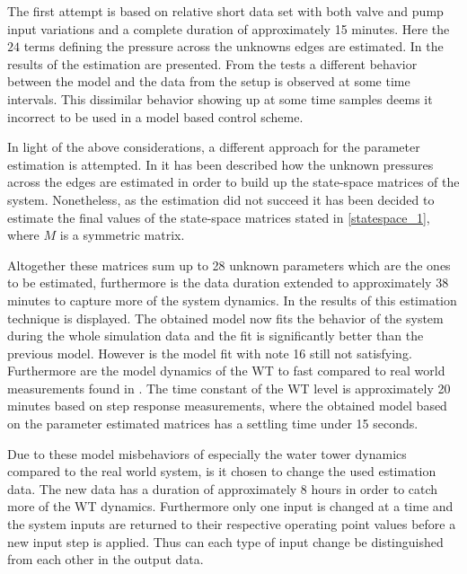 The first attempt is based on relative short data set with both valve and pump input variations and a complete duration of approximately 15 minutes. Here the $24$ terms defining the pressure across the unknowns edges are estimated. In  the results of the estimation are presented.
From the tests a different behavior between the model and the data from the setup is observed at some time intervals. This dissimilar behavior showing up at some time samples deems it incorrect to be used in a model based control scheme. 

In light of the above considerations, a different approach for the parameter estimation is attempted. In  it has been described how the unknown pressures across the edges are estimated in order to build up the state-space matrices of the system. Nonetheless, as the estimation did not succeed it has been decided to estimate the final values of the state-space matrices stated in \eqref{statespace_1}, where $M$ is a symmetric matrix.

Altogether these matrices sum up to 28 unknown parameters which are the ones to be estimated, furthermore is the data duration extended to approximately 38 minutes to capture more of the system dynamics. In  the results of this estimation technique is displayed. 
The obtained model now fits the behavior of the system during the whole simulation data and the fit is significantly better than the previous model. However is the model fit with note 16 still not satisfying. 
Furthermore are the model dynamics of the WT to fast compared to real world measurements found in . The time constant of the WT level is approximately 20 minutes based on step response measurements, where the obtained model based on the parameter estimated matrices has a settling time under 15 seconds.

Due to these model misbehaviors of especially the water tower dynamics compared to the real world system, is it chosen to change the used estimation data. The new data has a duration of approximately 8 hours in order to catch more of the WT dynamics. Furthermore only one input is changed at a time and the system inputs are returned to their respective operating point values before a new input step is applied. Thus can each type of input change be distinguished from each other in the output data. 


